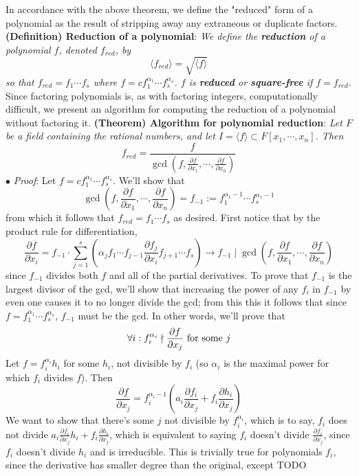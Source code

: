 \documentclass{article}
\newcommand*{\tb}{\textbf}
\newcommand*{\ti}{\textit}
\newcommand*{\n}{\newline}
\newcommand*{\nn}{\newline \newline}
\newcommand*{\Fx}{\ensuremath{F[x_1, \cdots, x_n]}}
\begin{document}
\nn
In accordance with the above theorem, we define the "reduced" form of a polynomial as the result of stripping away any extraneous or duplicate factors.
\nn
\tb{(Definition) Reduction of a polynomial}: \ti{We define the \tb{reduction} of a polynomial $ f $, denoted $ f_{red} $, by}
$$ \langle f_{red} \rangle = \sqrt{\langle f \rangle} $$
\indent \ti{so that $ f_{red} = f_1 \cdots f_s $ where $ f = c f_1^{\alpha_1} \cdots f_s^{\alpha_s} $. $ f $ is \tb{reduced} or \tb{square-free} if $ f = f_{red} $.}
\nn
Since factoring polynomials is, as with factoring integers, computationally difficult, we present an algorithm for computing the reduction of a polynomial without factoring it.
\nn
\tb{(Theorem) Algorithm for polynomial reduction}: \ti{Let $ F $ be a field containing the rational numbers, and let $ I = \langle f \rangle \subset \Fx $. Then}
$$ f_{red} = \frac{f}{\gcd(f, \frac{\partial f}{\partial x_1}, \cdots, \frac{\partial f}{\partial x_n})} $$
\n
\indent $ \bullet $ \ti{Proof}: Let $ f = c f_1^{\alpha_1} \cdots f_s^{\alpha_s} $. We'll show that
$$ \gcd \left( f, \frac{\partial f}{\partial x_1}, \cdots, \frac{\partial f}{\partial x_n} \right) = f_{-1} := f_1^{\alpha_1 - 1} \cdots f_s^{\alpha_s - 1} $$
from which it follows that $ f_{red} = f_1 \cdots f_s $ as desired. First notice that by the product rule for differentiation,
$$ \frac{\partial f}{\partial x_i} = f_{-1} \cdot \sum_{j = 1}^s \left( \alpha_j f_1 \cdots f_{j - 1} \frac{\partial f_j}{\partial x_i} f_{j + 1} \cdots f_s \right) \rightarrow f_{-1} \mid \gcd \left( f, \frac{\partial f}{\partial x_1}, \cdots, \frac{\partial f}{\partial x_n} \right) $$
since $ f_{-1} $ divides both $ f $ and all of the partial derivatives. To prove that $ f_{-1} $ is the largest divisor of the gcd, we'll show that increasing the power of any $ f_i $ in $ f_{-1} $ by even one causes it to no longer divide the gcd; from this this it follows that since $ f = f_1^{\alpha_1} \cdots f_s^{\alpha_s} $, $ f_{-1} $ must be the gcd. In other words, we'll prove that
$$ \forall i: f_i^{\alpha_i} \nmid \frac{\partial f}{\partial x_j} \text{ for some $ j $} $$
Let $ f = f_i^{\alpha_i} h_i $ for some $ h_i $, not divisible by $ f_i $ (so $ \alpha_i $ is the maximal power for which $ f_i $ divides $ f $). Then
$$ \frac{\partial f}{\partial x_j} = f_i^{\alpha_i - 1} \left( a_i \frac{\partial f_i}{\partial x_j} + f_i \frac{\partial h_i}{\partial x_j} \right) $$
We want to show that there's some $ j $ not divisible by $ f_i^{\alpha_i} $, which is to say, $ f_i $ does not divide $ a_i \frac{\partial f_i}{\partial x_j} h_i + f_i \frac{\partial h_i}{\partial x_j} $, which is equivalent to saying $ f_i $ doesn't divide $ \frac{\partial f_i}{\partial x_j} $, since $ f_i $ doesn't divide $ h_i $ and is irreducible. This is trivially true for polynomials $ f_i $, since the derivative has smaller degree than the original, except TODO
\end{document}
